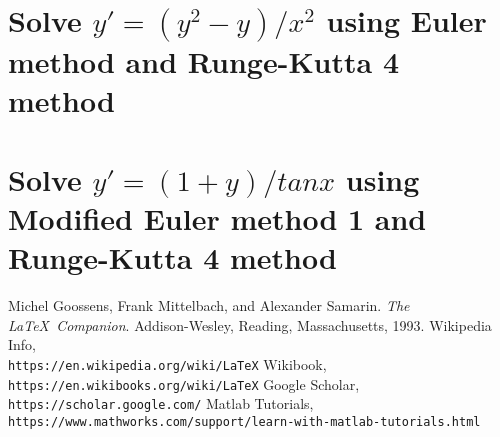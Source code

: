 \documentclass[a4paper,10pt]{article}
\begin{document}
\section{Solve $y'=(y^2-y)/x^2$ using Euler method and Runge-Kutta 4 method}
\section{Solve $y'=(1+y)/tan{x}$ using Modified Euler method 1 and Runge-Kutta 4 method}

\medskip

\begin{thebibliography}{9}
 Michel Goossens, Frank Mittelbach, and Alexander Samarin. \textit{The \LaTeX\ Companion}. Addison-Wesley, Reading, Massachusetts, 1993.
 Wikipedia Info, \\\texttt{https://en.wikipedia.org/wiki/LaTeX}
 Wikibook, \\\texttt{https://en.wikibooks.org/wiki/LaTeX}
 Google Scholar, \\\texttt{https://scholar.google.com/}
 Matlab Tutorials, \\\texttt{https://www.mathworks.com/support/learn-with-matlab-tutorials.html}
\end{thebibliography}
\end{document}
